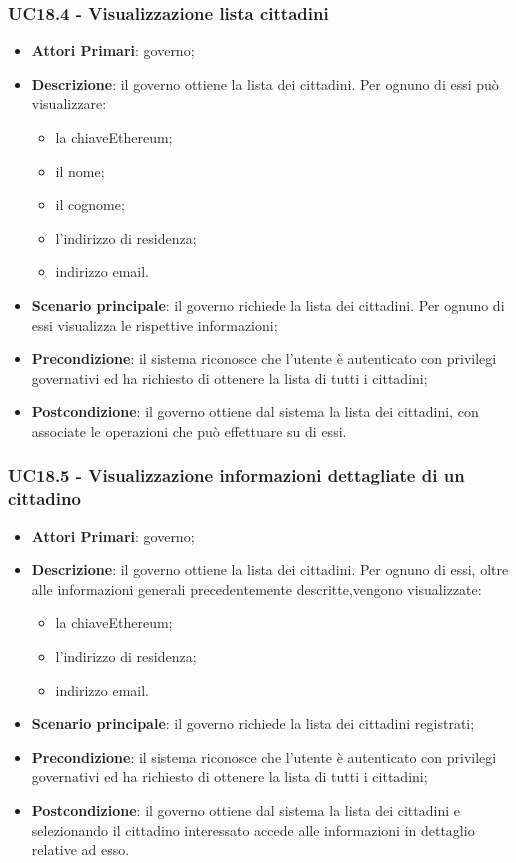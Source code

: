 \subsubsection{UC18.4 - Visualizzazione lista cittadini}
\begin{itemize}
	\item \textbf{Attori Primari}: governo;
	\item \textbf{Descrizione}: il governo ottiene la lista dei cittadini. Per ognuno di essi può visualizzare:
	\begin{itemize}
		\item la chiave\glosp Ethereum\glo;
		\item il nome;
		\item il cognome;
		\item l'indirizzo di residenza;
		\item indirizzo email.
	\end{itemize}
	\item \textbf{Scenario principale}: il governo richiede la lista dei cittadini. Per ognuno di essi visualizza le rispettive informazioni;
	\item \textbf{Precondizione}: il sistema riconosce che l'utente è autenticato con privilegi governativi ed ha richiesto di ottenere la lista di tutti i cittadini;
	\item \textbf{Postcondizione}: il governo ottiene dal sistema la lista dei cittadini, con associate le operazioni che può effettuare su di essi.
\end{itemize}


\subsubsection{UC18.5 - Visualizzazione informazioni dettagliate di un cittadino}
\begin{itemize}
	\item \textbf{Attori Primari}: governo;
	\item \textbf{Descrizione}: il governo ottiene la lista dei cittadini. Per ognuno di essi, oltre alle informazioni generali precedentemente descritte,vengono visualizzate:
	\begin{itemize}
		\item la chiave\glosp Ethereum\glo;
		\item l'indirizzo di residenza;
		\item indirizzo email.
	\end{itemize}
	\item \textbf{Scenario principale}: il governo richiede la lista dei cittadini registrati;
	\item \textbf{Precondizione}: il sistema riconosce che l'utente è autenticato con privilegi governativi ed ha richiesto di ottenere la lista di tutti i cittadini;
	\item \textbf{Postcondizione}: il governo ottiene dal sistema la lista dei cittadini e selezionando il cittadino interessato accede alle informazioni in dettaglio relative ad esso.
\end{itemize}

